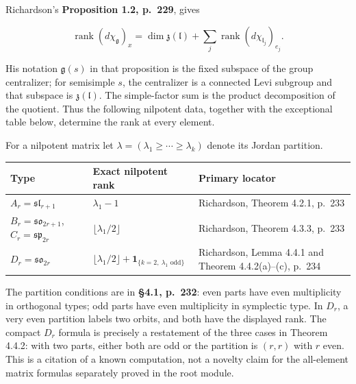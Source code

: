 Richardson's \textbf{Proposition 1.2, p.~229}, gives

\[
 \operatorname{rank}(d\chi_{\mathfrak g})_x
   =\dim\mathfrak z(\mathfrak l)
       +\sum_j\operatorname{rank}(d\chi_{\mathfrak l_j})_{e_j}.
 \tag{CC-RK.1}
\]

His notation \(\mathfrak g(s)\) in that proposition is the fixed subspace of the group centralizer; for semisimple \(s\), the centralizer is a connected Levi subgroup and that subspace is \(\mathfrak z(\mathfrak l)\). The simple-factor sum is the product decomposition of the quotient. Thus the following nilpotent data, together with the exceptional table below, determine the rank at every element.

For a nilpotent matrix let \(\lambda=(\lambda_1\geq\cdots\geq\lambda_k)\) denote its Jordan partition.

\begin{longtable}{@{}p{.23\linewidth}p{.38\linewidth}p{.29\linewidth}@{}}
\toprule\noalign{}
\begin{minipage}[b]{\linewidth}\raggedright
Type
\end{minipage} & \begin{minipage}[b]{\linewidth}\raggedleft
Exact nilpotent rank
\end{minipage} & \begin{minipage}[b]{\linewidth}\raggedright
Primary locator
\end{minipage} \\
\midrule\noalign{}
\endhead
\bottomrule\noalign{}
\endlastfoot
\(A_r=\mathfrak{sl}_{r+1}\) & \(\lambda_1-1\) & Richardson, Theorem 4.2.1, p.~233 \\
\(B_r=\mathfrak{so}_{2r+1}\), \(C_r=\mathfrak{sp}_{2r}\) & \(\lfloor\lambda_1/2\rfloor\) & Richardson, Theorem 4.3.3, p.~233 \\
\(D_r=\mathfrak{so}_{2r}\) & \(\lfloor\lambda_1/2\rfloor+\mathbf1_{\{k=2,\ \lambda_1\text{ odd}\}}\) & Richardson, Lemma 4.4.1 and Theorem 4.4.2(a)--(c), p.~234 \\
\end{longtable}

The partition conditions are in \textbf{§4.1, p.~232}: even parts have even multiplicity in orthogonal types; odd parts have even multiplicity in symplectic type. In \(D_r\), a very even partition labels two orbits, and both have the displayed rank. The compact \(D_r\) formula is precisely a restatement of the three cases in Theorem 4.4.2: with two parts, either both are odd or the partition is \((r,r)\) with \(r\) even. This is a citation of a known computation, not a novelty claim for the all-element matrix formulas separately proved in the root module.

